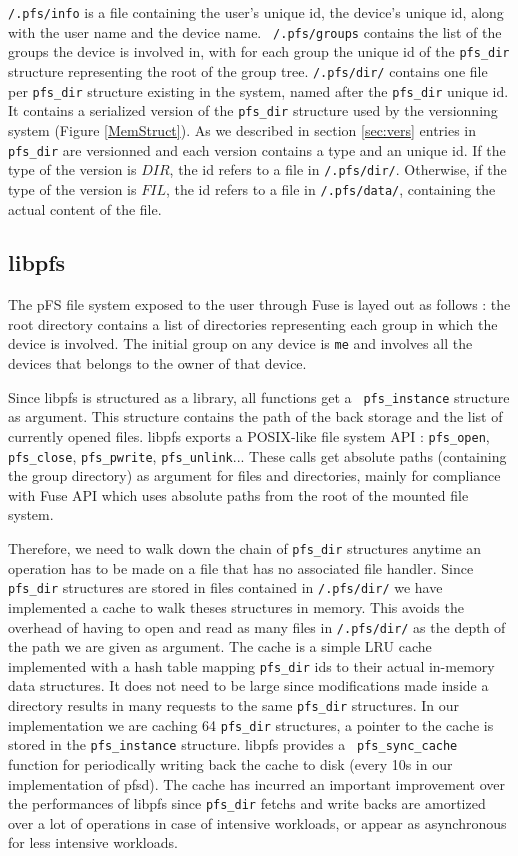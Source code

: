 {\tt /.pfs/info} is a file containing the user's unique id, the device's
unique id, along with the user name and the device name. {\tt
  /.pfs/groups} contains the list of the groups the device is involved
in, with for each group the unique id of the {\tt pfs\_dir} structure
representing the root of the group tree. {\tt /.pfs/dir/} contains one
file per {\tt pfs\_dir} structure existing in the system, named after
the {\tt pfs\_dir} unique id. It contains a serialized version of the
{\tt pfs\_dir} structure used by the versionning system (Figure
\ref{MemStruct}). As we described in section \ref{sec:vers}
entries in {\tt pfs\_dir} are versionned and each version contains a
type and an unique id. If the type of the version is $DIR$, the id
refers to a file in {\tt /.pfs/dir/}. Otherwise, if the type of the
version is $FIL$, the id refers to a file in {\tt /.pfs/data/},
containing the actual content of the file.

\subsection {libpfs}

The pFS file system exposed to the user through Fuse is layed out as
follows : the root directory contains a list of directories
representing each group in which the device is involved. The initial
group on any device is {\tt me} and involves all the devices that
belongs to the owner of that device.

Since libpfs is structured as a library, all functions get a {\tt
  pfs\_instance} structure as argument. This structure contains the path
of the back storage and the list of currently opened files. libpfs
exports a POSIX-like file system API : {\tt pfs\_open}, {\tt
  pfs\_close}, {\tt pfs\_pwrite}, {\tt pfs\_unlink}... These calls get
absolute paths (containing the group directory) as argument for files
and directories, mainly for compliance with Fuse API
which uses absolute paths from the root of the mounted file system.

Therefore, we need to walk down the chain of {\tt pfs\_dir} structures
anytime an operation has to be made on a file that has no associated
file handler. Since {\tt pfs\_dir} structures are stored in files
contained in {\tt /.pfs/dir/} we have implemented a cache to walk
theses structures in memory. This avoids the overhead of having to
open and read as many files in {\tt /.pfs/dir/} as the depth of the
path we are given as argument. The cache is a simple LRU cache
implemented with a hash table mapping {\tt pfs\_dir} ids to their
actual in-memory data structures. It does not need to be large since
modifications made inside a directory results in many requests to the
same {\tt pfs\_dir} structures. In our implementation we are caching
64 {\tt pfs\_dir} structures, a pointer to the cache is stored in the
{\tt pfs\_instance} structure. libpfs provides a {\tt
  pfs\_sync\_cache} function for periodically writing back the cache
to disk (every 10s in our implementation of pfsd). The cache has
incurred an important improvement over the performances of libpfs
since {\tt pfs\_dir} fetchs and write backs are amortized over a lot
of operations in case of intensive workloads, or appear as
asynchronous for less intensive workloads.

